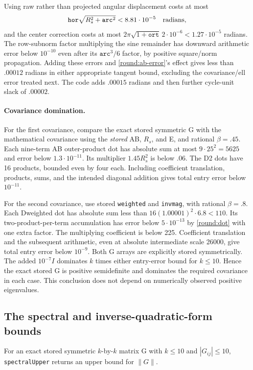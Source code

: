 Using raw rather than projected angular displacement costs at most
\[
 \mathtt{hor}\sqrt{R_s^2+\mathtt{arc}^2}<8.81\cdot10^{-5}
 \quad\hbox{radians},
\]
and the center correction costs at most
$2\pi\sqrt{1+\mathtt{ort}}\,2\cdot10^{-6}<1.27\cdot10^{-5}$
radians.  The row-subnorm factor multiplying the sine remainder has
downward arithmetic error below $10^{-10}$ even after its
$\mathtt{arc}^3/6$ factor, by positive square/norm propagation.
Adding these errors and \eqref{round:ab-error}'s effect gives less
than $.00012$ radians in either appropriate tangent bound, excluding
the covariance/ell error treated next.  The code adds $.00015$
radians and then further cycle-unit slack of $.00002$.

\paragraph{Covariance domination.}
For the first covariance, compare the exact stored symmetric G with
the mathematical covariance using the \emph{stored} AB, $R_s$, and E,
and rational $\beta=.45$.  Each nine-term AB outer-product dot has
absolute sum at most $9\cdot25^2=5625$ and error below
$1.3\cdot10^{-11}$.  Its multiplier $1.45R_s^2$ is below $.06$.
The D2 dots have 16 products, bounded even by four each.
Including coefficient translation, products, sums, and the intended
diagonal addition gives total entry error below $10^{-11}$.

For the second covariance, use stored \texttt{weighted} and
\texttt{invmag}, with rational $\beta=.8$.  Each Dweighted dot has
absolute sum less than
$16(1.00001)^2\cdot6.8<110$.
Its two-product-per-term accumulation has error below
$5\cdot10^{-13}$ by \eqref{round:dot} with one extra factor.
The multiplying coefficient is below 225.  Coefficient translation
and the subsequent arithmetic, even at absolute intermediate scale
26000, give total entry error below $10^{-9}$.
Both G arrays are explicitly stored symmetrically.  The added
$10^{-7}I$ dominates $k$ times either entry-error bound for $k\le10$.
Hence the exact stored G is positive semidefinite and dominates the
required covariance in each case.  This conclusion does not depend
on numerically observed positive eigenvalues.

\subsection{The spectral and inverse-quadratic-form bounds}
\label{round:ell}

\begin{lemma}\label{round:spectral}
For an exact stored symmetric $k$-by-$k$ matrix G with $k\le10$ and
$|G_{ij}|\le10$, \texttt{spectralUpper} returns an upper bound for
$\|G\|$.
\end{lemma}

